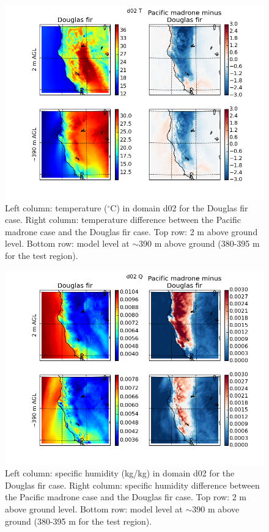 \begin{figure}[here]
\includegraphics[width=1\textwidth]{ch2-BL/figures/T_d02_s0pt08.png}
\caption{Left column: temperature ($^\circ$C) in domain d02 for the Douglas fir case.  Right column: temperature difference between the Pacific madrone case and the Douglas fir case.  Top row: 2 m above ground level.  Bottom row: model level at $\sim$390 m above ground (380-395 m for the test region).}
\label{fig:BL_WRFmapT}
\end{figure}

\begin{figure}[here]
\includegraphics[width=1\textwidth]{ch2-BL/figures/Q_d02_s0pt08.png}
\caption{Left column: specific humidity (kg/kg) in domain d02 for the Douglas fir case.  Right column: specific humidity difference between the Pacific madrone case and the Douglas fir case.  Top row: 2 m above ground level.  Bottom row: model level at $\sim$390 m above ground (380-395 m for the test region).}
\label{fig:BL_WRFmapQ}
\end{figure}

